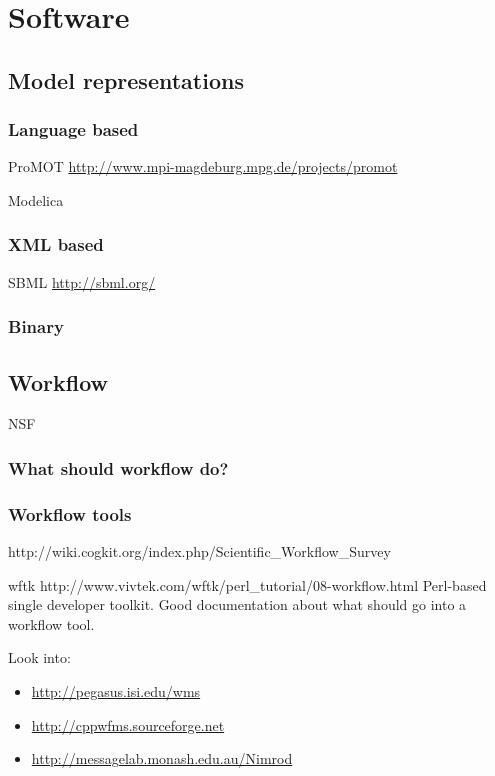 \chapter{Software}

\section{Model representations}

\subsection{Language based}

ProMOT \url{http://www.mpi-magdeburg.mpg.de/projects/promot}

Modelica

\subsection{XML based}

SBML \url{http://sbml.org/}


\subsection{Binary}


\section{Workflow}
NSF 

\subsection{What should workflow do?}

\subsection{Workflow tools}

http://wiki.cogkit.org/index.php/Scientific_Workflow_Survey


wftk http://www.vivtek.com/wftk/perl_tutorial/08-workflow.html
Perl-based single developer toolkit.  Good documentation about what
should go into a workflow tool.

Look into:
\begin{itemize}
\item \url{http://pegasus.isi.edu/wms}
\item \url{http://cppwfms.sourceforge.net}
\item \url{http://messagelab.monash.edu.au/Nimrod}
\end{itemize}

